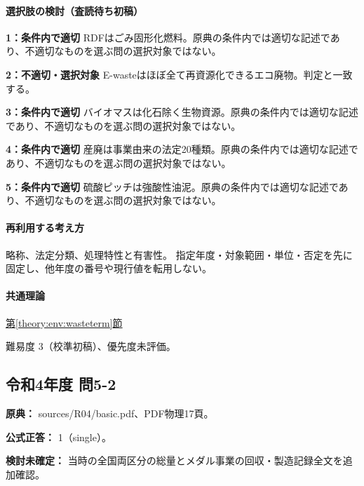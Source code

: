 \paragraph{選択肢の検討（査読待ち初稿）}\mbox{}\par

\noindent\textbf{1：条件内で適切} RDFはごみ固形化燃料。原典の条件内では適切な記述であり、不適切なものを選ぶ問の選択対象ではない。\par

\noindent\textbf{2：不適切・選択対象} E-wasteはほぼ全て再資源化できるエコ廃物。判定と一致する。\par

\noindent\textbf{3：条件内で適切} バイオマスは化石除く生物資源。原典の条件内では適切な記述であり、不適切なものを選ぶ問の選択対象ではない。\par

\noindent\textbf{4：条件内で適切} 産廃は事業由来の法定20種類。原典の条件内では適切な記述であり、不適切なものを選ぶ問の選択対象ではない。\par

\noindent\textbf{5：条件内で適切} 硫酸ピッチは強酸性油泥。原典の条件内では適切な記述であり、不適切なものを選ぶ問の選択対象ではない。\par

\paragraph{再利用する考え方} 略称、法定分類、処理特性と有害性。 指定年度・対象範囲・単位・否定を先に固定し、他年度の番号や現行値を転用しない。

\paragraph{共通理論} \hyperref[theory:env:wasteterm]{第\ref*{theory:env:wasteterm}節}

\par 難易度 3（校準初稿）、優先度未評価。

\subsection{令和4年度 問5-2}
\label{q:r04-reg-basic-5-2}

\noindent\textbf{原典：} sources/R04/basic.pdf、PDF物理17頁。

\textbf{公式正答：} 1（single）。

\par\textbf{検討未確定：} 当時の全国両区分の総量とメダル事業の回収・製造記録全文を追加確認。

